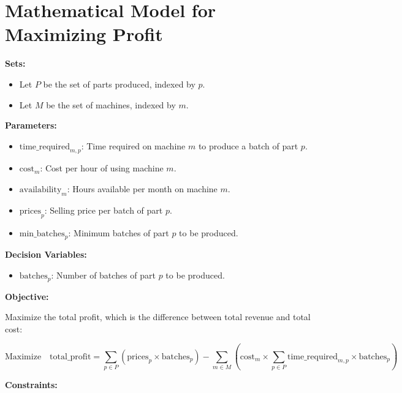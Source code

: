 \documentclass{article}
\begin{document}
\section*{Mathematical Model for Maximizing Profit}

\textbf{Sets:}
\begin{itemize}
    \item Let \( P \) be the set of parts produced, indexed by \( p \).
    \item Let \( M \) be the set of machines, indexed by \( m \).
\end{itemize}

\textbf{Parameters:}
\begin{itemize}
    \item \( \text{time\_required}_{m,p} \): Time required on machine \( m \) to produce a batch of part \( p \).
    \item \( \text{cost}_{m} \): Cost per hour of using machine \( m \).
    \item \( \text{availability}_{m} \): Hours available per month on machine \( m \).
    \item \( \text{prices}_{p} \): Selling price per batch of part \( p \).
    \item \( \text{min\_batches}_{p} \): Minimum batches of part \( p \) to be produced.
\end{itemize}

\textbf{Decision Variables:}
\begin{itemize}
    \item \( \text{batches}_{p} \): Number of batches of part \( p \) to be produced.
\end{itemize}

\textbf{Objective:}

Maximize the total profit, which is the difference between total revenue and total cost:

\[
\text{Maximize} \quad \text{total\_profit} = \sum_{p \in P} \left( \text{prices}_{p} \times \text{batches}_{p} \right) - \sum_{m \in M} \left( \text{cost}_{m} \times \sum_{p \in P} \text{time\_required}_{m,p} \times \text{batches}_{p} \right)
\]

\textbf{Constraints:}
\end{document}
